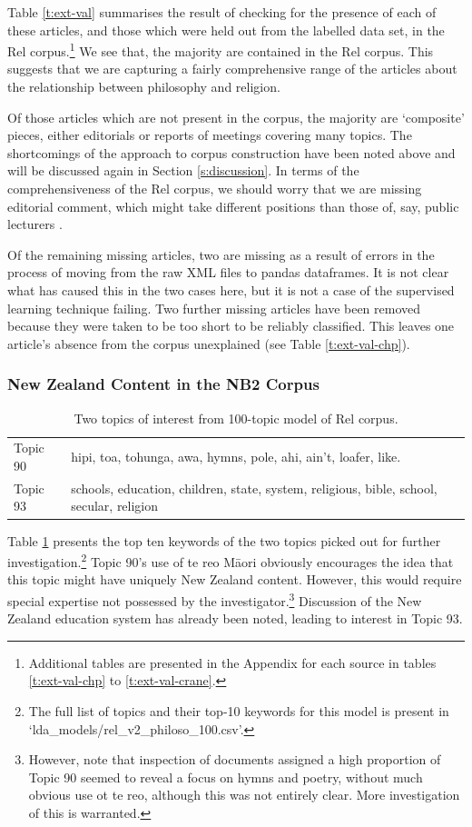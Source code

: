 \documentclass{article}
\begin{document}
Table \ref{t:ext-val} summarises the result of checking for the presence of each of these articles, and those which were held out from the labelled data set, in the Rel corpus.\footnote{Additional tables are presented in the Appendix for each source in tables \ref{t:ext-val-chp} to \ref{t:ext-val-crane}.} We see that, the majority are contained in the Rel corpus. This suggests that we are capturing a fairly comprehensive range of the articles about the relationship between philosophy and religion.

Of those articles which are not present in the corpus, the majority are `composite' pieces, either editorials or reports of meetings covering many topics. The shortcomings of the approach to corpus construction have been noted above and will be discussed again in Section \ref{s:discussion}. In terms of the comprehensiveness of the Rel corpus, we should worry that we are missing editorial comment, which might take different positions than those of, say, public lecturers \cite[540--541]{wood-2014}. %

Of the remaining missing articles, two are missing as a result of errors in the process of moving from the raw XML files to pandas dataframes. It is not clear what has caused this in the two cases here, but it is not a case of the supervised learning technique failing. Two further missing articles have been removed because they were taken to be too short to be reliably classified. This leaves one article's absence from the corpus unexplained (see Table \ref{t:ext-val-chp}).

\subsubsection{New Zealand Content in the NB2 Corpus}

\begin{table}
  \begin{tabular}{l|l}
    Topic 90 & hipi, toa, tohunga, awa, hymns, pole, ahi, ain't, loafer, like. \\
    Topic 93 & schools, education, children, state, system, religious, bible, school, secular, religion
  \end{tabular}
  \label{t:2-topics}
  \caption{Two topics of interest from 100-topic model of Rel corpus.}
\end{table}

Table \ref{t:2-topics} presents the top ten keywords of the two topics picked out for further investigation.\footnote{The full list of topics and their top-10 keywords for this model is present in `lda\_\-models/rel\_\-v2\_\-philoso\_\-100.csv'.} Topic 90's use of te reo Māori obviously encourages the idea that this topic might have uniquely New Zealand content. However, this would require special expertise not possessed by the investigator.\footnote{
However, note that inspection of documents assigned a high proportion of Topic 90 seemed to reveal a focus on hymns and poetry, without much obvious use ot te reo, although this was not entirely clear. More investigation of this is warranted.
} Discussion of the New Zealand education system has already been noted, leading to interest in Topic 93.
\end{document}
